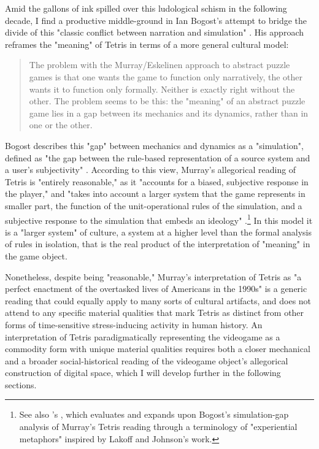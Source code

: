 Amid the gallons of ink spilled over this ludological schism in the following decade, I find a productive middle-ground in Ian Bogost's attempt to bridge the divide of this "classic conflict between narration and simulation" \autocite*[99]{Bogost2006-ec}. His approach reframes the "meaning" of Tetris in terms of a more general cultural model:
\blockquote{
  The problem with the Murray/Eskelinen approach to abstract puzzle games is that one wants the game to function only narratively, the other wants it to function only formally. Neither is exactly right without the other. The problem seems to be this: the "meaning" of an abstract puzzle game lies in a gap between its mechanics and its dynamics, rather than in one or the other. \autocite*{Bogost2009-gj}
}
Bogost describes this "gap" between mechanics and dynamics as a "simulation", defined as "the gap between the rule-based representation of a source system and a user's subjectivity" \autocite*[107]{Bogost2006-ec}. According to this view, Murray's allegorical reading of Tetris is "entirely reasonable," as it "accounts for a biased, subjective response in the player," and "takes into account a larger system that the game represents in smaller part, the function of the unit-operational rules of the simulation, and a subjective response to the simulation that embeds an ideology" \autocite[101]{Bogost2006-ec}.\footnote{
  See also \citeauthor{Begy2010-zz}'s , which evaluates and expands upon Bogost's simulation-gap analysis of Murray's Tetris reading through a terminology of "experiential metaphors" inspired by Lakoff and Johnson's work.
  }
In this model it is a "larger system" of culture, a system at a higher level than the formal analysis of rules in isolation, that is the real product of the interpretation of "meaning" in the game object.

Nonetheless, despite being "reasonable," Murray's interpretation of Tetris as "a perfect enactment of the overtasked lives of Americans in the 1990s" is a generic reading that could equally apply to many sorts of cultural artifacts, and does not attend to any specific material qualities that mark Tetris as distinct from other forms of time-sensitive stress-inducing activity in human history. An interpretation of Tetris paradigmatically representing the videogame as a commodity form with unique material qualities requires both a closer mechanical and a broader social-historical reading of the videogame object's allegorical construction of digital space, which I will develop further in the following sections.

